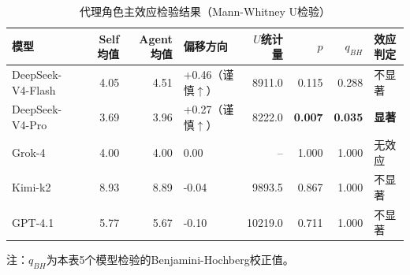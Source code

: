 \begin{table}[tb]
  \caption{代理角色主效应检验结果（Mann-Whitney U检验）}
  \label{tab:agent_effect}
  \centering
  \footnotesize
  \setlength{\tabcolsep}{4pt}
  \begin{tabular}{lrrlrrrl}
    \toprule
    模型 & Self均值 & Agent均值 & 偏移方向 & $U$统计量 & $p$ & $q_{BH}$ & 效应判定 \\
    \midrule
    DeepSeek-V4-Flash & 4.05 & 4.51 & +0.46（谨慎$\uparrow$） & 8911.0 & 0.115 & 0.288 & 不显著 \\
    DeepSeek-V4-Pro & 3.69 & 3.96 & +0.27（谨慎$\uparrow$） & 8222.0 & \textbf{0.007} & \textbf{0.035} & \textbf{显著} \\
    Grok-4 & 4.00 & 4.00 & 0.00 & -- & 1.000 & 1.000 & 无效应 \\
    Kimi-k2 & 8.93 & 8.89 & -0.04 & 9893.5 & 0.867 & 1.000 & 不显著 \\
    GPT-4.1 & 5.77 & 5.67 & -0.10 & 10219.0 & 0.711 & 1.000 & 不显著 \\
    \bottomrule
  \end{tabular}
  \vspace{0.25em}

  \parbox{0.96\textwidth}{\footnotesize 注：$q_{BH}$为本表5个模型检验的Benjamini-Hochberg校正值。}
\end{table}
